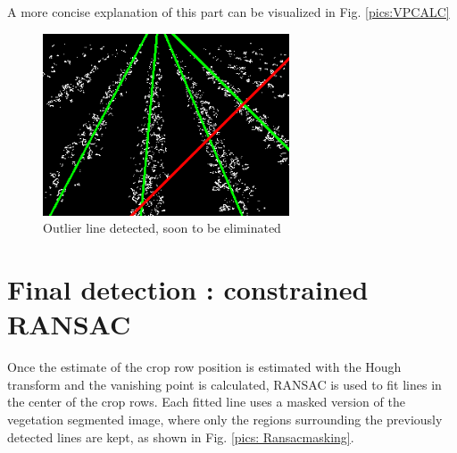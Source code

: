 A more concise explanation of this part can be visualized in Fig. \ref{pics:VPCALC}


\begin{figure}[H]
   \centering
   \includegraphics[width=0.65\textwidth]{Report/images/outlierdetected.png}
   \caption{Outlier line detected, soon to be eliminated}
   \label{pics:outlier}
\end{figure}





\section{Final detection : constrained RANSAC}
\label{sec:gliederung}

Once the estimate of the crop row position is estimated with the Hough transform and the vanishing point is calculated, RANSAC is used to fit lines in the center of the crop rows. Each fitted line uses a masked version of the vegetation segmented image, where only the regions surrounding the previously detected lines are kept, as shown in Fig. \ref{pics: Ransacmasking}. \\

